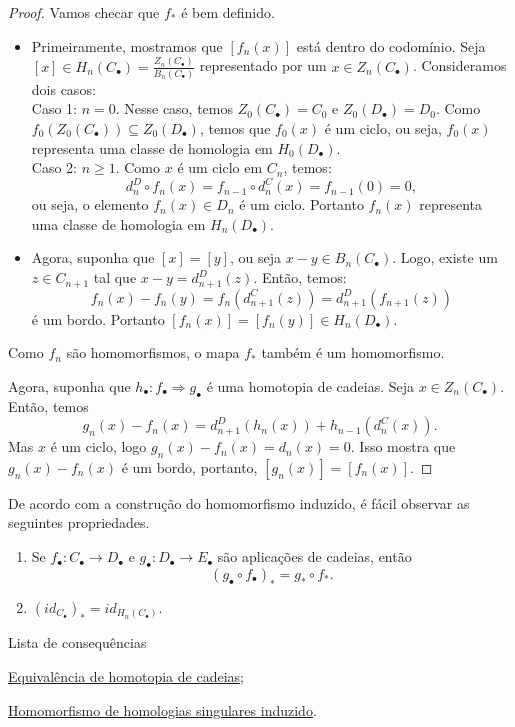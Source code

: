 \begin{proof}
    Vamos checar que $f_*$ é bem definido.
    \begin{itemize}
        \item Primeiramente, mostramos que $[f_n(x)]$ está dentro do codomínio. Seja $[x]\in H_n(C_\bullet)=\frac{Z_n(C_\bullet)}{B_n(C_\bullet)}$ representado por um $x\in Z_n(C_\bullet)$. Consideramos dois casos:\\
        Caso 1: $n=0$. Nesse caso, temos $Z_0(C_\bullet)=C_0$ e $Z_0(D_\bullet)=D_0$. Como $f_0(Z_0(C_\bullet))\subseteq Z_0(D_\bullet)$, temos que $f_0(x)$ é um ciclo, ou seja, $f_0(x)$ representa uma classe de homologia em $H_0(D_\bullet)$.\\
        Caso 2: $n\ge 1$. Como $x$ é um ciclo em $C_n$, temos:
        \[d_n^D\circ f_n(x)=f_{n-1}\circ d_n^C(x)=f_{n-1}(0)=0,\]
        ou seja, o elemento $f_n(x)\in D_n$ é um ciclo. Portanto $f_n(x)$ representa uma classe de homologia em $H_n(D_\bullet)$.
        \item Agora, suponha que $[x]=[y]$, ou seja $x-y\in B_n(C_\bullet)$. Logo, existe um $z\in C_{n+1}$ tal que $x-y=d_{n+1}^D(z)$. Então, temos: 
        \[f_n(x)-f_n(y)=f_n(d_{n+1}^C(z))=d_{n+1}^D (f_{n+1}(z))\]
        é um bordo. Portanto $[f_n(x)]=[f_n(y)]\in H_n(D_\bullet).$
    \end{itemize}
    Como $f_n$ são homomorfismos, o mapa $f_*$ também é um homomorfismo. 

    Agora, suponha que $h_\bullet: f_\bullet \Rightarrow g_\bullet$ é uma homotopia de cadeias. Seja $x\in Z_n(C_\bullet)$. Então, temos 
    \[g_n(x)-f_n(x)=d_{n+1}^D(h_n(x))+h_{n-1}(d_n^C(x)).\]
    Mas $x$ é um ciclo, logo $g_n(x)-f_n(x)=d_n(x)=0$. Isso mostra que $g_n(x)-f_n(x)$ é um bordo, portanto, $[g_n(x)]=[f_n(x)]$.
\end{proof}

De acordo com a construção do homomorfismo induzido, é fácil observar as seguintes propriedades.

\begin{corol}
    \begin{enumerate}
        \item Se $f_\bullet: C_\bullet\rightarrow D_\bullet$ e $g_\bullet:D_\bullet\rightarrow E_\bullet$ são aplicações de cadeias, então 
        \[(g_\bullet\circ f_\bullet)_*=g_*\circ f_*.\]
        \item $(id_{C_\bullet})_*=id_{H_n(C_\bullet)}$.
    \end{enumerate}

\end{corol}

\begin{titlemize}{Lista de consequências}
    \item \hyperref[equivalencia-de-homotopia-de-cadeias-def]{Equivalência de homotopia de cadeias};\\
    \item \hyperref[homomorfismo-de-homologias-singulares-induzido-prop]{Homomorfismo de homologias singulares induzido}.
\end{titlemize}
